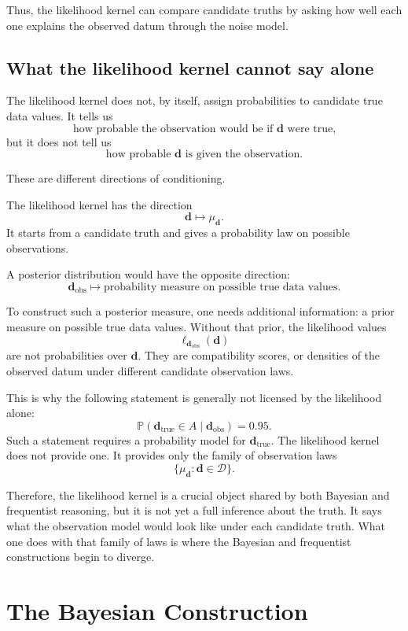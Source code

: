 \documentclass[11pt]{article}
\newcommand{\Dspace}{\mathcal D}
\newcommand{\dtrue}{\mathbf d_{\mathrm{true}}}
\newcommand{\dobs}{\mathbf d_{\mathrm{obs}}}
\newcommand{\Prob}{\mathbb P}
\begin{document}
Thus, the likelihood kernel can compare candidate truths by asking how well each one explains the observed datum through the noise model.

\subsection{What the likelihood kernel cannot say alone}

The likelihood kernel does not, by itself, assign probabilities to candidate true data values. It tells us
\[
    \text{how probable the observation would be if } \mathbf d \text{ were true,}
\]
but it does not tell us
\[
    \text{how probable } \mathbf d \text{ is given the observation.}
\]

These are different directions of conditioning.

The likelihood kernel has the direction
\[
    \mathbf d
    \longmapsto
    \mu_{\mathbf d}.
\]
It starts from a candidate truth and gives a probability law on possible observations.

A posterior distribution would have the opposite direction:
\[
    \dobs
    \longmapsto
    \text{probability measure on possible true data values}.
\]

To construct such a posterior measure, one needs additional information: a prior measure on possible true data values. Without that prior, the likelihood values
\[
    \ell_{\dobs}(\mathbf d)
\]
are not probabilities over \(\mathbf d\). They are compatibility scores, or densities of the observed datum under different candidate observation laws.

This is why the following statement is generally not licensed by the likelihood alone:
\[
    \Prob(\dtrue\in A\mid \dobs)=0.95.
\]
Such a statement requires a probability model for \(\dtrue\). The likelihood kernel does not provide one. It provides only the family of observation laws
\[
    \{\mu_{\mathbf d}:\mathbf d\in\Dspace\}.
\]

Therefore, the likelihood kernel is a crucial object shared by both Bayesian and frequentist reasoning, but it is not yet a full inference about the truth. It says what the observation model would look like under each candidate truth. What one does with that family of laws is where the Bayesian and frequentist constructions begin to diverge.

\section{The Bayesian Construction}
\end{document}
